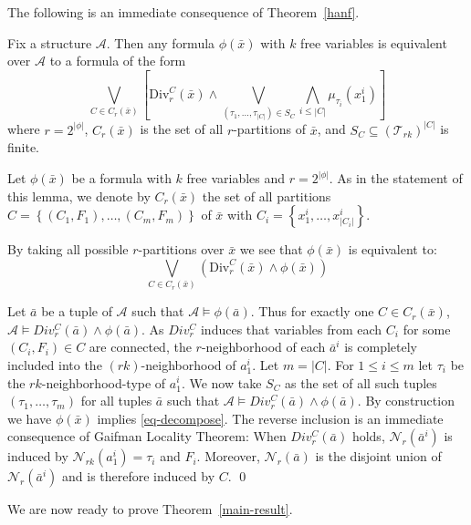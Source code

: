 \documentclass{LMCS}
\newcommand\cA{\ensuremath{{\mathcal A}}\xspace}
\newcommand\cN{\ensuremath{{\mathcal N}}\xspace}
\newcommand{\T}{\ensuremath{{\mathcal T}}}
\begin{document}
The following is an immediate consequence of
Theorem~\ref{hanf}.

\begin{lem}\label{lemma-decompose}
  Fix a structure \cA.  Then any formula $\phi(\bar x)$ with $k$ free variables
  is equivalent over \cA to a formula of the form
  \begin{equation}\label{eq-decompose}
\bigvee_{C\in C_r(\bar x)} \left[ \text{Div}_r^C(\bar x) \wedge
\bigvee_{(\tau_1, \ldots, \tau_{|C|}) \in S_C} \bigwedge_{i\leq |C|}
\mu_{\tau_{i}}(x^{i}_1)\right]
  \end{equation}
where $r=2^{|\phi|}$, $C_r(\bar x)$ is the set of all $r$-partitions of $\bar x$, 
and $S_C \subseteq (\T_{rk})^{|C|}$ is finite.
\end{lem}

\proof
Let $\phi(\bar x)$ be a formula with $k$ free variables and $r=2^{|\phi|}$.
As in the statement of this lemma, we denote by $C_r(\bar x)$ the set of all partitions
$C = \left\{ (C_{1},F_{1}), \ldots, (C_{m},F_{m}) \right\}$ of $\bar x$ with $C_{i} = \left\{
x_{1}^{i}, \ldots, x_{|C_i|}^{i} \right\}$.

By taking all possible $r$-partitions over $\bar x$ we see that
$\phi(\bar x)$ is equivalent to:
\begin{equation*}
\bigvee_{C\in C_r(\bar x)} \left( \text{Div}_{r}^{C}(\bar x) \wedge \phi(\bar x) \right)
\end{equation*}

Let $\bar a$ be a tuple of $\cA$ such that $\cA \models \phi(\bar a)$. Thus for
exactly one $C \in C_r(\bar x)$, $\cA \models Div_{r}^{C}(\bar a) \wedge
\phi(\bar a)$.  As $Div_{r}^{C}$ induces that variables from each $C_{i}$ for
some $(C_i, F_i) \in C$ are connected, the $r$-neighborhood of each $\bar a^i$
is completely included into the $(rk)$-neighborhood of $a_1^i$. Let
$m=|C|$. For $1 \leq i \leq m$ let $\tau_i$ be the $rk$-neighborhood-type of
$a_1^i$. We now take $S_C$ as the set of all such tuples $(\tau_1, \ldots,
\tau_m)$ for all tuples $\bar a$ such that $\cA\models Div_{r}^{C}(\bar a)\land
\phi(\bar a) $. By construction we have $\phi(\bar x)$ implies
\eqref{eq-decompose}. The reverse inclusion is an immediate consequence of
Gaifman Locality Theorem: When $Div_r^{C}(\bar a)$ holds, $\cN_r(\bar a^i)$ is
induced by $\cN_{rk}(a_1^i)=\tau_i$ and $F_i$. Moreover, $\cN_r(\bar a)$ is the
disjoint union of $\cN_r(\bar a^i)$ and is therefore induced by $C$. \qed

\medskip
We are now ready to prove Theorem~\ref{main-result}.
\medskip
\end{document}
